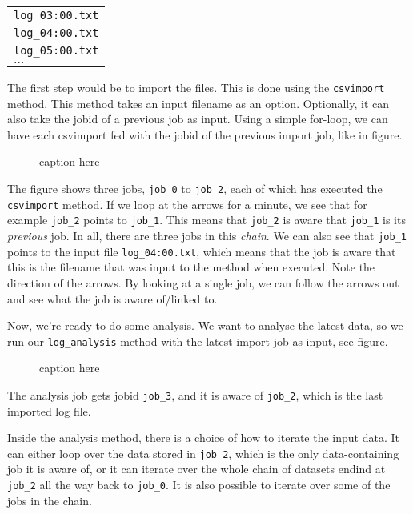 \documentclass[a4paper]{article}
\begin{document}
\begin{tabular}{l}
  \texttt{log\_03:00.txt}\\
  \texttt{log\_04:00.txt}\\
  \texttt{log\_05:00.txt}\\
  $\dots$
\end{tabular}

\noindent The first step would be to import the files.  This is done
using the \texttt{csvimport} method.  This method takes an input
filename as an option.  Optionally, it can also take the jobid of a
previous job as input.  Using a simple for-loop, we can have each
csvimport fed with the jobid of the previous import job, like in
figure.
\begin{figure}[h!]
  \begin{center}
    
    \caption{caption here}
    \label{figure:example}
  \end{center}
\end{figure}
The figure shows three jobs, \texttt{job\_0} to \texttt{job\_2}, each
of which has executed the \texttt{csvimport} method.  If we loop at
the arrows for a minute, we see that for example \texttt{job\_2}
points to \texttt{job\_1}.  This means that \texttt{job\_2} is aware
that \texttt{job\_1} is its \textsl{previous} job.  In all, there are
three jobs in this \textsl{chain}.  We can also see that
\texttt{job\_1} points to the input file \texttt{log\_04:00.txt},
which means that the job is aware that this is the filename that was
input to the method when executed.  Note the direction of the arrows.
By looking at a single job, we can follow the arrows out and see what
the job is aware of/linked to.

Now, we're ready to do some analysis.  We want to analyse the latest
data, so we run our \texttt{log\_analysis} method with the latest
import job as input, see figure.
\begin{figure}[h!]
  \begin{center}
    
    \caption{caption here}
    \label{figure:example}
  \end{center}
\end{figure}
The analysis job gets jobid \texttt{job\_3}, and it is aware of
\texttt{job\_2}, which is the last imported log file.

Inside the analysis method, there is a choice of how to iterate the
input data.  It can either loop over the data stored in
\texttt{job\_2}, which is the only data-containing job it is aware of,
or it can iterate over the whole chain of datasets endind at
\texttt{job\_2} all the way back to \texttt{job\_0}.  It is also
possible to iterate over some of the jobs in the chain.
\end{document}

